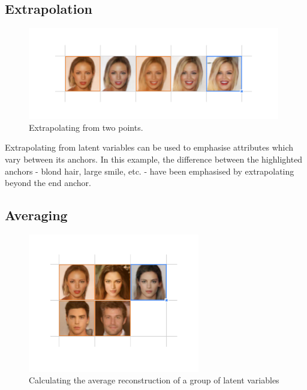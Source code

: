 \documentclass[letterpaper]{article}
\begin{document}
\subsection{Extrapolation}
\begin{figure}[ht!]
  \centering
  \includegraphics[width=11.0cm]{figs/08-extrapolation.jpg}
  \caption{Extrapolating from two points.}
\end{figure}

Extrapolating from latent variables can be used to emphasise attributes which vary between its anchors. In this example, the difference between the highlighted anchors - blond hair, large smile, etc.  - have been emphasised by extrapolating beyond the end anchor.

\subsection{Averaging}
\begin{figure}[ht!]
  \centering
  \includegraphics[width=7.5cm]{figs/10-averaging.jpg}
  \caption{Calculating the average reconstruction of a group of latent variables}
\end{figure}

\newpage 
\end{document}
